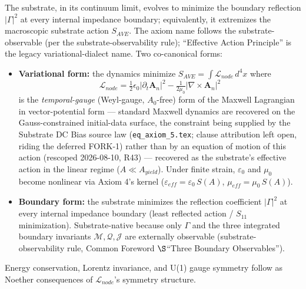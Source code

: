 \begin{axiom}
The substrate, in its continuum limit, evolves to minimize the boundary
reflection $|\Gamma|^2$ at every internal impedance boundary; equivalently,
it extremizes the macroscopic substrate action $S_{AVE}$. The axiom name
follows the substrate-observable (per the substrate-observability rule);
``Effective Action Principle'' is the legacy variational-dialect name.
Two co-canonical forms:
\begin{itemize}\itemsep 0pt
\item \textbf{Variational form:} the dynamics minimize
$S_{AVE} = \int \mathcal{L}_{node}\, d^4x$ where
\begin{equation}
    \mathcal{L}_{node} = \tfrac{1}{2}\epsilon_0 |\partial_t \mathbf{A}_n|^2
    - \tfrac{1}{2\mu_0} |\nabla \times \mathbf{A}_n|^2
    \label{eq:lagrangian}
\end{equation}
is the \emph{temporal-gauge} (Weyl-gauge, $A_0$-free) form of the Maxwell Lagrangian in vector-potential form --- standard Maxwell dynamics are recovered on the Gauss-constrained initial-data surface, the constraint being supplied by the Substrate DC Bias source law (\texttt{eq\_axiom\_5.tex}; clause attribution left open, riding the deferred FORK-1) rather than by an equation of motion of this action (rescoped 2026-08-10, R43) --- recovered as the
substrate's effective action in the linear regime ($A \ll A_{yield}$). Under
finite strain, $\varepsilon_0$ and $\mu_0$ become nonlinear via Axiom 4's
kernel ($\varepsilon_{eff} = \varepsilon_0\,S(A)$, $\mu_{eff} = \mu_0\,S(A)$).
\item \textbf{Boundary form:} the substrate minimizes the reflection coefficient
$|\Gamma|^2$ at every internal impedance boundary (least reflected action /
$S_{11}$ minimization). Substrate-native because only $\Gamma$ and the three
integrated boundary invariants $\mathcal{M}, \mathcal{Q}, \mathcal{J}$ are
externally observable (substrate-observability rule, Common Foreword $\S$``Three Boundary Observables'').
\end{itemize}
Energy conservation, Lorentz invariance, and U(1) gauge symmetry follow as
Noether consequences of $\mathcal{L}_{node}$'s symmetry structure.
\end{axiom}

